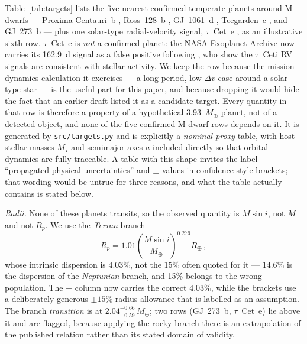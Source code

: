 \documentclass[twocolumn,10pt]{article}
\begin{document}
Table~\ref{tab:targets} lists the five nearest confirmed temperate planets
around M dwarfs --- Proxima Centauri~b \citep{anglada16}, Ross~128~b \citep{bonfils18},
GJ~1061~d \citep{dreizler20}, Teegarden~c \citep{dreizler24}, and GJ~273~b
\citep{astudillo17} --- plus one solar-type radial-velocity signal, $\tau$~Cet~e
\citep{feng17}, as an illustrative sixth row. $\tau$~Cet~e is \emph{not} a confirmed
planet: the NASA Exoplanet Archive now carries its 162.9~d signal as a false positive
following \citet{figueira25}, who show the $\tau$~Ceti RV signals are consistent with
stellar activity. We keep the row because the mission-dynamics calculation it
exercises --- a long-period, low-$\Delta v$ case around a solar-type star --- is
the useful part for this paper, and because dropping it would hide the fact that
an earlier draft listed it as a candidate target. Every quantity in that row is therefore a
property of a hypothetical 3.93~$M_\oplus$ planet, not of a detected object, and
none of the five confirmed M-dwarf rows depends on it. It is generated by {\tt src/targets.py} and is explicitly a
\emph{nominal-proxy} table, with host stellar masses $M_\star$ and semimajor axes $a$
included directly so that orbital dynamics are fully traceable. A table with this
shape invites the label ``propagated physical uncertainties'' and $\pm$ values in
confidence-style brackets; that wording would be untrue for three reasons, and
what the table actually contains is stated below.

\emph{Radii.} None of these planets transits, so the observed quantity is
$M\sin i$, not $M$ and not $R_p$. We use the \citet{chenkipping17} \emph{Terran}
branch
\begin{equation}
R_p = 1.01\left(\frac{M\sin i}{M_\oplus}\right)^{0.279}R_\oplus\,,
\label{eq:ck}
\end{equation}
whose intrinsic dispersion is $4.03\%$, not the $15\%$ often quoted for it --- $14.6\%$
is the dispersion of the \emph{Neptunian} branch, and 15\% belongs to the
wrong population. The $\pm$ column now carries the correct $4.03\%$, while the
brackets use a deliberately generous $\pm15\%$ radius allowance that is labelled
as an assumption. The branch \emph{transition} is at
$2.04^{+0.66}_{-0.59}\,M_\oplus$; two rows (GJ~273~b, $\tau$~Cet~e) lie above it
and are flagged, because applying the rocky branch there is an extrapolation of
the published relation rather than its stated domain of validity.
\end{document}
